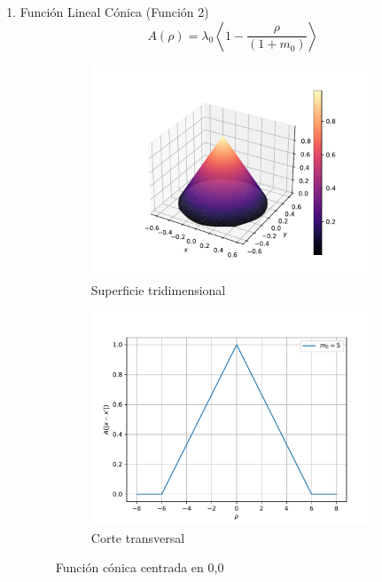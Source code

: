 \begin{enumerate}
	\item Función Lineal Cónica (Función 2)
	\begin{equation}
		A(\rho)=\lambda_0\left<1-\frac{\rho}{(1+m_0)}\right>
	\end{equation}
	\begin{figure}
	    \centering
	    \sffamily
	    \begin{subfigure}{0.45\textwidth}
	    \centering
	        \includegraphics[width=\textwidth]{figuras/conica3d.pdf}
	        \caption{Superficie tridimensional}
	        \label{fig:conica.3d}
	    \end{subfigure}
	    \begin{subfigure}{0.45\textwidth}
	    \centering
	        \includegraphics[width=\textwidth]{figuras/conica2d.pdf}
	        \caption{Corte transversal}
	        \label{fig:conica.2d}
	    \end{subfigure}
	    \caption{Función cónica centrada en 0,0}
	    \label{fig:conica}
	\end{figure}


\end{enumerate}
